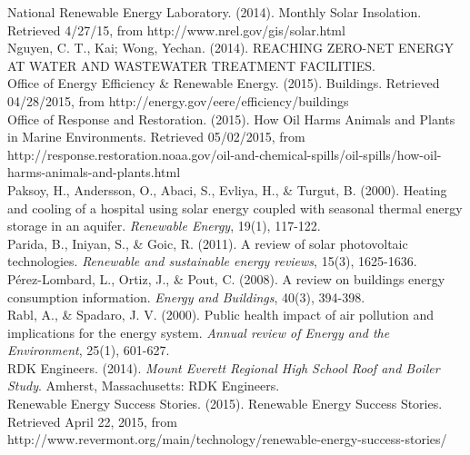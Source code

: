 \hangindent=0.5in
National Renewable Energy Laboratory. (2014). Monthly Solar Insolation. Retrieved 4\slash 27\slash 15, from http:\slash \slash www.nrel.gov\slash gis\slash solar.html \\

\hangindent=0.5in
Nguyen, C. T., Kai; Wong, Yechan. (2014). REACHING ZERO-NET ENERGY AT WATER AND WASTEWATER TREATMENT FACILITIES. \\

\hangindent=0.5in
Office of Energy Efficiency \& Renewable Energy. (2015). Buildings. Retrieved 04\slash 28\slash 2015, from http:\slash \slash energy.gov\slash eere\slash efficiency\slash buildings \\

\hangindent=0.5in
Office of Response and Restoration. (2015). How Oil Harms Animals and Plants in Marine Environments. Retrieved 05\slash 02\slash 2015, from http:\slash \slash response.restoration.noaa.gov\slash oil-and-chemical-spills\slash oil-spills\slash how-oil-harms-animals-and-plants.html \\

\hangindent=0.5in
Paksoy, H., Andersson, O., Abaci, S., Evliya, H., \& Turgut, B. (2000). Heating and cooling of a hospital using solar energy coupled with seasonal thermal energy storage in an aquifer. \emph{Renewable Energy}, 19(1), 117-122. \\

\hangindent=0.5in
Parida, B., Iniyan, S., \& Goic, R. (2011). A review of solar photovoltaic technologies. \emph{Renewable and sustainable energy reviews}, 15(3), 1625-1636. \\

\hangindent=0.5in
Pérez-Lombard, L., Ortiz, J., \& Pout, C. (2008). A review on buildings energy consumption information. \emph{Energy and Buildings}, 40(3), 394-398. \\

\hangindent=0.5in
Rabl, A., \& Spadaro, J. V. (2000). Public health impact of air pollution and implications for the energy system. \emph{Annual review of Energy and the Environment}, 25(1), 601-627. \\

\hangindent=0.5in
RDK Engineers. (2014). \emph{Mount Everett Regional High School Roof and Boiler Study}. Amherst, Massachusetts: RDK Engineers. \\

\hangindent=0.5in
Renewable Energy Success Stories. (2015). Renewable Energy Success Stories. Retrieved April 22, 2015, from http:\slash \slash www.revermont.org\slash main\slash technology\slash renewable-energy-success-stories\slash  \\

